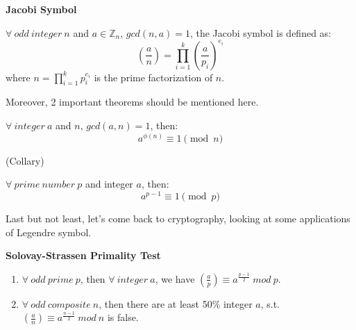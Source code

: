 \documentclass{Math_Note}
\begin{document}
\begin{df}
    \textbf{Jacobi Symbol} \par
    $\forall\ odd\ integer\ n$ and $a \in \mathbb{Z}_{n}$, $gcd(n,a)=1$, the Jacobi symbol is defined as:
    \[
        \left(\frac{a}{n}\right) = 
        \prod_{i=1}^{k}\left(\frac{a}{p_i}\right)^{e_i}
    \]
    where $n=\prod_{i=1}^{k}p_i^{e_i}$ is the prime factorization of $n$.
\end{df}

Moreover, 2 important theorems should be mentioned here.

\begin{thm}
     \par
    $\forall\ integer\ a$ and $n$, $gcd(a,n)=1$, then:
    \[
        a^{\phi(n)}\equiv 1\pmod{n}
    \]
\end{thm}

\begin{thm}
    (Collary) \par
    $\forall\ prime\ number\ p$ and integer $a$, then:
    \[
        a^{p-1}\equiv 1\pmod{p}
    \]
\end{thm}

Last but not least, let's come back to cryptography, looking at some applications of Legendre symbol.

\begin{thm}
    \textbf{Solovay-Strassen Primality Test} \par
    \begin{enumerate}
        \item $\forall\ odd\ prime\ p$, then $\forall\ integer\ a$, we have $\left(\frac{a}{p}\right) \equiv a^{\frac{p-1}{2}}\ mod\ p$.
        \item $\forall\ odd\ composite\ n$, then there are at least 50\% integer $a$, s.t. $\left(\frac{a}{n}\right) \equiv a^{\frac{n-1}{2}}\ mod\ n$ is false.
    \end{enumerate}
\end{thm}
\end{document}

